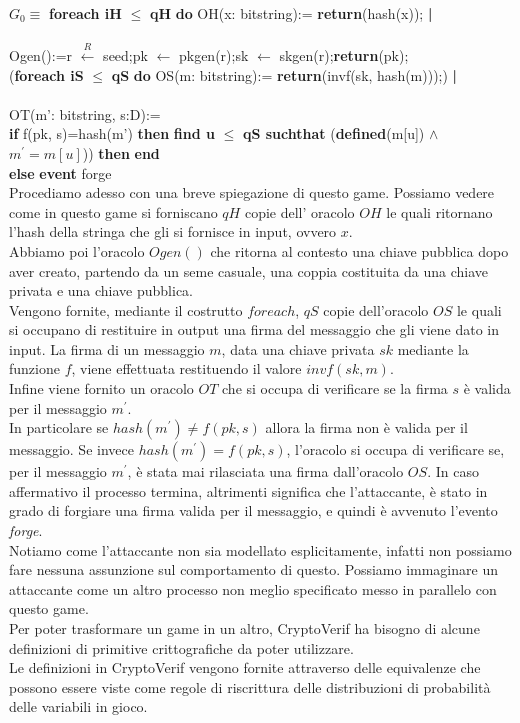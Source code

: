 \documentclass[a4paper,openright,twoside,12pt]{report}
\newcommand{\foreach}[2]{\textbf{foreach #1} $\leq$ \textbf{#2} \textbf{do}}
\newcommand{\return}[1]{\textbf{return}(#1);}
\newcommand{\pipe}{ \textbf{|} \\ \\}
\newcommand{\setR}[2]{#1 $\xleftarrow{R}$ #2;}
\newcommand{\set}[2]{#1 $\leftarrow$ #2;}
\newcommand{\ifthen}[2]{\textbf{if} #1 \textbf{then} #2}
\newcommand{\find}[6]{\textbf{find #1} $\leq$ \textbf{#2 suchthat} (\textbf{defined}(#3) $\wedge$ #4)) \textbf{then} #5 \\ \textbf{else} #6}
\newcommand{\event}{\textbf{event}}
\newcommand{\myend}{\textbf{end}}
\begin{document}
$G_0 \equiv$ \foreach{iH}{qH} OH(x: bitstring):= \return{hash(x)}\pipe Ogen():=\setR{r}{seed}\set{pk}{pkgen(r)}\set{sk}{skgen(r)}\return{pk}\\
	(\foreach{iS}{qS} OS(m: bitstring):= \return{invf(sk, hash(m))})\pipe
	OT(m': bitstring, s:D):=\\ \ifthen{f(pk, s)=hash(m')}{\find{u}{qS}{m[u]} {$m^{'}=m[u]$} {\myend} {\event} forge}
	\\

Procediamo adesso con una breve spiegazione di questo game.
Possiamo vedere come in questo game si forniscano $qH$ copie dell' oracolo $OH$ le quali ritornano l'hash della stringa che gli si fornisce in input, ovvero $x$.\\
Abbiamo poi l'oracolo $Ogen()$ che ritorna al contesto una chiave pubblica dopo aver creato, partendo da un seme casuale, una coppia costituita da una chiave privata e una chiave pubblica.\\
Vengono fornite, mediante il costrutto $foreach$, $qS$ copie dell'oracolo $OS$ le quali si occupano di restituire in output una firma del messaggio che gli viene dato in input.
La firma di un messaggio $m$, data una chiave privata $sk$ mediante la funzione $f$, viene effettuata restituendo il valore $invf(sk, m)$.\\ 
Infine viene fornito un oracolo $OT$ che si occupa di verificare se la firma $s$ \`e valida per il messaggio $m^{'}$. \\
In particolare se $hash(m^{'}) \neq f(pk, s)$ allora la firma non \`e valida per il messaggio. Se invece $hash(m^{'}) = f(pk, s)$,
l'oracolo si occupa di verificare se, per il messaggio $m^{'}$, \`e stata mai rilasciata una firma dall'oracolo $OS$. In caso affermativo il processo termina, altrimenti significa che 
l'attaccante, \`e stato in grado di forgiare una firma valida per il messaggio, e quindi \`e avvenuto l'evento \emph{forge}.\\
Notiamo come l'attaccante non sia modellato esplicitamente, infatti non possiamo fare nessuna assunzione sul comportamento di questo.
Possiamo immaginare un attaccante come un altro processo non meglio specificato messo in parallelo con questo game.\\ 
Per poter trasformare un game in un altro, CryptoVerif ha bisogno di alcune definizioni di primitive crittografiche da poter utilizzare.
\\
Le definizioni in CryptoVerif vengono fornite attraverso delle equivalenze che possono essere viste come regole di riscrittura 
delle distribuzioni di probabilit\`a delle variabili in gioco.
\end{document}
